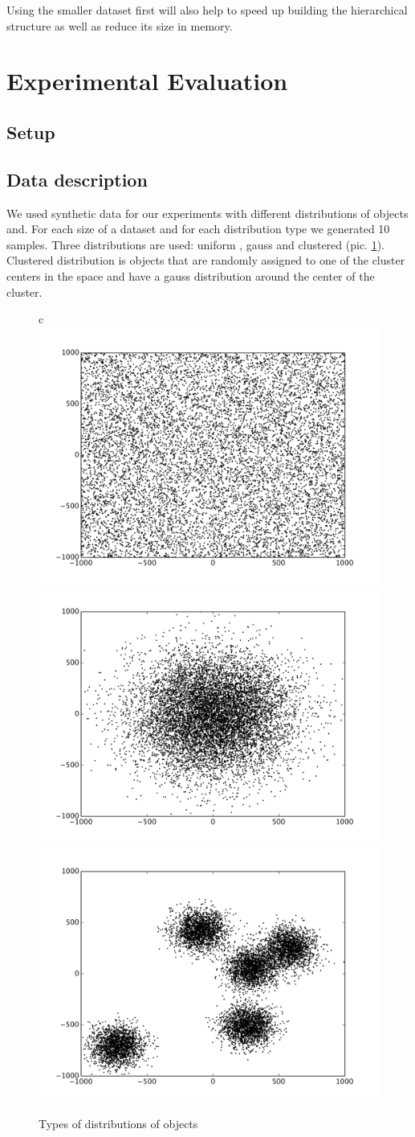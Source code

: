 \documentclass{vldb}
\begin{document}
Using the smaller dataset first will also help to speed up building the hierarchical structure as well as reduce its size in memory.

\section{Experimental Evaluation}
\label{s_experimental_evaluation}

\subsection{Setup}
\label{s_setup}

\subsection{Data description}
We used synthetic data for our experiments with different distributions of objects and. For each size of a dataset and for each distribution type we generated 10 samples. Three distributions are used: uniform , gauss and clustered (pic. \ref{fig:distributions}). Clustered distribution is objects that are randomly assigned to one of the cluster centers in the space and have a gauss distribution around the center of the cluster.
 
\begin{figure}{c}{}
    \centering
    \includegraphics[width=0.3\columnwidth]{figures/picUni}
    \includegraphics[width=0.3\columnwidth]{figures/picGauss}
    \includegraphics[width=0.3\columnwidth]{figures/picClust}
    \caption{Types of distributions of objects}
    \label{fig:distributions}
\end{figure}
\end{document}
